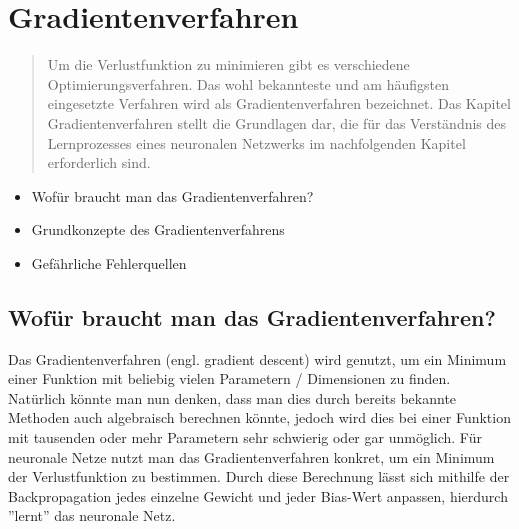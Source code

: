 \thispagestyle{empty}
\section{Gradientenverfahren}\label{sec:gradientenverfahren}   
\begin{tcolorbox}[title={Inhalte des \textit{Gradientenverfahren}}]
  \begin{quotation}\noindent
    Um die Verlustfunktion zu minimieren gibt es verschiedene Optimierungsverfahren. Das wohl bekannteste und am häufigsten eingesetzte Verfahren wird als Gradientenverfahren bezeichnet.
    Das Kapitel Gradientenverfahren stellt die Grundlagen dar, die für das Verständnis des Lernprozesses eines neuronalen Netzwerks im nachfolgenden Kapitel erforderlich sind.
  \end{quotation}
  \begin{itemize}
    \item Wofür braucht man das Gradientenverfahren?
    \item Grundkonzepte des Gradientenverfahrens
    \item Gefährliche Fehlerquellen

  \end{itemize}
\end{tcolorbox}


\subsection{Wofür braucht man das Gradientenverfahren?}\label{subsec:gradientenverfahren:wofuer}
Das Gradientenverfahren (engl. gradient descent) wird genutzt, um ein Minimum einer Funktion mit beliebig vielen Parametern / Dimensionen zu finden.
Natürlich könnte man nun denken, dass man dies durch bereits bekannte Methoden auch algebraisch berechnen könnte, jedoch wird dies 
bei einer Funktion mit tausenden oder mehr Parametern sehr schwierig oder gar unmöglich.
Für neuronale Netze nutzt man das Gradientenverfahren konkret, um ein Minimum der Verlustfunktion zu bestimmen. 
Durch diese Berechnung lässt sich mithilfe der Backpropagation jedes einzelne Gewicht und jeder Bias-Wert anpassen, hierdurch ''lernt'' das neuronale Netz.
\cite{TR17}


